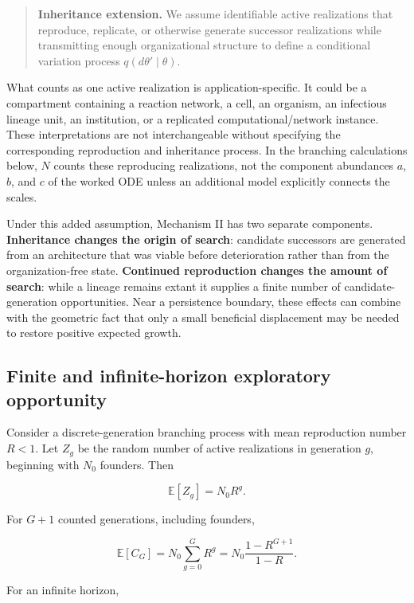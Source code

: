 \documentclass[11pt,a4paper]{article}
\begin{document}
\begin{quote}
\textbf{Inheritance extension.} We assume identifiable active realizations that reproduce, replicate, or otherwise generate successor realizations while transmitting enough organizational structure to define a conditional variation process $q(d\theta'\mid\theta)$.
\end{quote}

What counts as one active realization is application-specific. It could be a compartment containing a reaction network, a cell, an organism, an infectious lineage unit, an institution, or a replicated computational/network instance. These interpretations are not interchangeable without specifying the corresponding reproduction and inheritance process. In the branching calculations below, $N$ counts these reproducing realizations, not the component abundances $a$, $b$, and $c$ of the worked ODE unless an additional model explicitly connects the scales.

Under this added assumption, Mechanism II has two separate components. \textbf{Inheritance changes the origin of search}: candidate successors are generated from an architecture that was viable before deterioration rather than from the organization-free state. \textbf{Continued reproduction changes the amount of search}: while a lineage remains extant it supplies a finite number of candidate-generation opportunities. Near a persistence boundary, these effects can combine with the geometric fact that only a small beneficial displacement may be needed to restore positive expected growth.

\subsection{Finite and infinite-horizon exploratory opportunity}

Consider a discrete-generation branching process with mean reproduction number $R<1$. Let $Z_g$ be the random number of active realizations in generation $g$, beginning with $N_0$ founders. Then

\[
\mathbb E[Z_g]=N_0R^g.
\]

For $G+1$ counted generations, including founders,

\begin{equation}
\mathbb E[C_G]
=
N_0\sum_{g=0}^{G}R^g
=
N_0\frac{1-R^{G+1}}{1-R}.
\label{eq:finite-lineage}
\end{equation}

For an infinite horizon,
\end{document}
